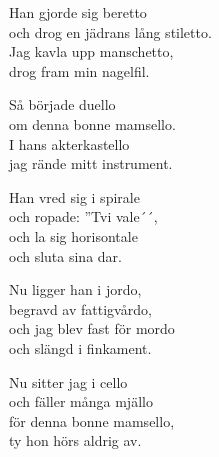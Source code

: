 \vspace{10pt}
Han gjorde sig beretto\\
och drog en jädrans lång stiletto.\\
Jag kavla upp manschetto,\\
drog fram min nagelfil.\par
\vspace{10pt}
Så började duello\\
om denna bonne mamsello.\\
I hans akterkastello\\
jag rände mitt instrument.\par
\vspace{10pt}
Han vred sig i spirale\\
och ropade: ''Tvi vale´´,\\
och la sig horisontale\\
och sluta sina dar.\par
\vspace{10pt}
Nu ligger han i jordo,\\
begravd av fattigvårdo,\\
och jag blev fast för mordo\\
och slängd i finkament.\par
\vspace{10pt}
Nu sitter jag i cello\\
och fäller många mjällo\\
för denna bonne mamsello,\\
ty hon hörs aldrig av.
